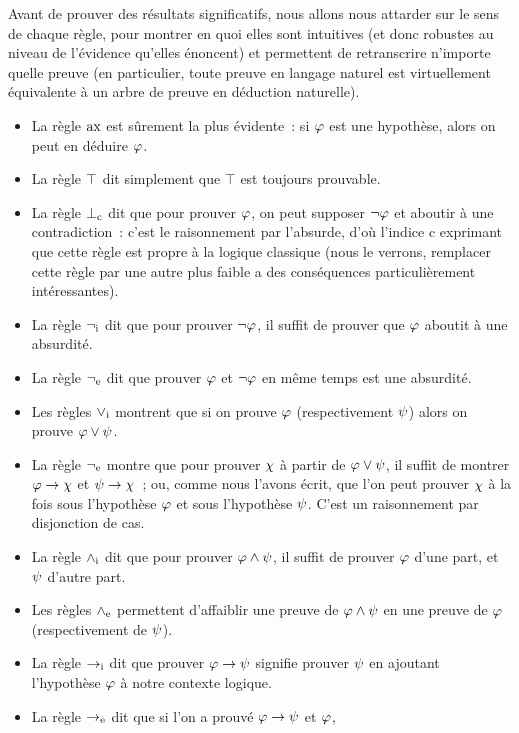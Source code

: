 Avant de prouver des résultats significatifs, nous allons nous attarder sur
le sens de chaque règle, pour montrer en quoi elles sont intuitives (et donc
robustes au niveau de l'évidence qu'elles énoncent) et permettent de
retranscrire n'importe quelle preuve (en particulier, toute preuve en langage
naturel est virtuellement équivalente à un arbre de preuve en déduction
naturelle).
\begin{itemize}
\item La règle $\operatorname{ax}$ est sûrement la plus évidente~: si $\varphi$ est une
  hypothèse, alors on peut en déduire $\varphi$.
\item La règle $\top$ dit simplement que $\top$ est toujours prouvable.
\item La règle $\bot_{\mathrm{c}}$ dit que pour prouver $\varphi$, on peut supposer
  $\lnot \varphi$ et aboutir à une contradiction~: c'est le raisonnement par
  l'absurde, d'où l'indice \og $\mathrm{c}$\fg{}
  exprimant que cette règle est propre à la
  logique classique (nous le verrons, remplacer cette règle par une autre plus
  faible a des conséquences particulièrement intéressantes).
\item La règle $\mathord{\lnot}_{\mathrm{i}}$ dit que pour prouver $\lnot \varphi$, il suffit de
  prouver que $\varphi$ aboutit à une absurdité.
\item La règle $\mathord{\lnot}_{\mathrm{e}}$ dit que prouver $\varphi$ et $\lnot \varphi$ en même temps
  est une absurdité.
\item Les règles $\mathord{\lor}_{\mathrm{i}}$ montrent que si on prouve $\varphi$ (respectivement
  $\psi$) alors on prouve $\varphi\lor \psi$.
\item La règle $\mathord{\lnot}_{\mathrm{e}}$ montre que pour prouver $\chi$ à partir de
  $\varphi\lor \psi$, il suffit de montrer
  $\varphi\to \chi$ et $\psi\to \chi$~; ou, comme nous
  l'avons écrit, que l'on peut prouver $\chi$ à la fois sous l'hypothèse
  $\varphi$ et
  sous l'hypothèse $\psi$. C'est un raisonnement par disjonction de cas.
\item La règle $\mathord{\land}_{\mathrm{i}}$ dit que pour prouver $\varphi\land \psi$, il suffit de
  prouver $\varphi$ d'une part, et $\psi$ d'autre part.
\item Les règles $\mathord{\land}_{\mathrm{e}}$ permettent d'affaiblir une preuve de
  $\varphi\land \psi$ en une preuve de $\varphi$ (respectivement de $\psi$).
\item La règle $\mathord{\to}_{\mathrm{i}}$ dit que prouver $\varphi\to \psi$ signifie prouver
  $\psi$ en ajoutant l'hypothèse $\varphi$ à notre contexte logique.
\item La règle $\mathord{\to}_{\mathrm{e}}$ dit que si l'on a prouvé $\varphi\to \psi$ et $\varphi$,

\end{itemize}
